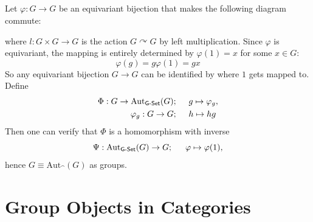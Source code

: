 \documentclass[12pt]{article}
\begin{document}
\setcounter{subsection}{16}
\subsection{} 
Let $\varphi: G \rightarrow G$ be an equivariant bijection that makes the following diagram commute: 
\begin{center}
\end{center}
where $l: G \times G \rightarrow G$ is the action $G \curvearrowright G$ by left multiplication. 
Since $\varphi$ is equivariant, the mapping is entirely determined by $\varphi(1) = x$ for some $x \in G$: 
$$\varphi(g) = g\varphi(1) = gx$$
So any equivariant bijection $G \rightarrow G$ can be identified by where $1$ gets mapped to. 
Define 
\begin{align*}
  \Phi: G \rightarrow \text{Aut}_{\mathsf{G\text{-}Set}}(G); \hspace{1.5em} & g \mapsto \varphi_{g}, \\ 
  \varphi_{g}: G \rightarrow G; \hspace{1.5em} & h \mapsto hg
\end{align*}
Then one can verify that $\Phi$ is a homomorphism with inverse 
$$\Psi: \text{Aut}_{\mathsf{G\text{-}Set}}(G) \rightarrow G; \hspace{1.5em} \varphi \mapsto \varphi(1),$$
hence $G \equiv \text{Aut}_{\cat}(G)$ as groups. 

\section{Group Objects in Categories} 
\setcounter{subsection}{0}
\end{document}
